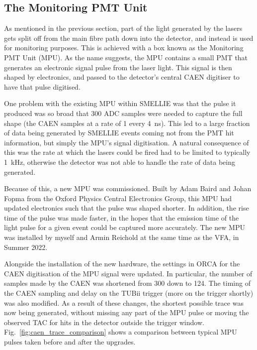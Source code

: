 \subsection{The Monitoring PMT Unit}\label{sec:smellie_mpu}
As mentioned in the previous section, part of the light generated by the lasers gets split off from the main fibre path down into the detector, and instead is used for monitoring purposes. This is achieved with a box known as the Monitoring PMT Unit (MPU). As the name suggests, the MPU contains a small PMT that generates an electronic signal pulse from the laser light. This signal is then shaped by electronics, and passed to the detector's central CAEN digitiser to have that pulse digitised.

One problem with the existing MPU within SMELLIE was that the pulse it produced was so broad that 300 ADC samples were needed to capture the full shape (the CAEN samples at a rate of 1 every \SI{4}{\ns}). This led to a large fraction of data being generated by SMELLIE events coming not from the PMT hit information, but simply the MPU's signal digitisation. A natural consequence of this was the rate at which the lasers could be fired had to be limited to typically \SI{1}{\kHz}, otherwise the detector was not able to handle the rate of data being generated.

Because of this, a new MPU was commissioned. Built by Adam Baird and Johan Fopma from the Oxford Physics Central Electronics Group, this MPU had updated electronics such that the pulse was shaped shorter. In addition, the rise time of the pulse was made faster, in the hopes that the emission time of the light pulse for a given event could be captured more accurately. The new MPU was installed by myself and Armin Reichold at the same time as the VFA, in Summer 2022.

Alongside the installation of the new hardware, the settings in ORCA for the CAEN digitisation of the MPU signal were updated. In particular, the number of samples made by the CAEN was shortened from 300 down to 124. The timing of the CAEN sampling and delay on the TUBii trigger (more on the trigger shortly) was also modified. As a result of these changes, the shortest possible trace was now being generated, without missing any part of the MPU pulse or moving the observed TAC for hits in the detector outside the trigger window. Fig.~\ref{fig:caen_trace_comparison} shows a comparison between typical MPU pulses taken before and after the upgrades.

